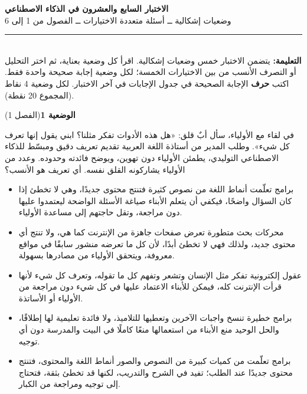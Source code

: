 \documentclass[11pt,a4paper]{article}
\begin{document}
\linespread{1.08}\selectfont
\begin{center}
{\LARGE\khatt\textbf{الاختبار السابع والعشرون في الذكاء الاصطناعي}}\\[4pt]
{\normalsize وضعيات إشكالية ــ أسئلة متعددة الاختيارات ــ الفصول من 1 إلى 6}
\end{center}
\vspace{-2pt}\rule{\textwidth}{0.6pt}\\[2pt]
\textbf{التعليمة:} يتضمن الاختبار خمس وضعيات إشكالية. اقرأ كل وضعية بعناية، ثم اختر التحليل أو التصرف الأنسب
من بين الاختيارات الخمسة؛ لكل وضعية إجابة صحيحة واحدة فقط.
اكتب \textbf{حرف} الإجابة الصحيحة في جدول الإجابات في آخر الاختبار.
لكل وضعية 4 نقاط (المجموع 20 نقطة).
\vspace{4pt}

\noindent
{\large\khatt\textbf{الوضعية 1}}\hfill{\small(الفصل 1)}\par\nopagebreak\vspace{3pt}
\setlength{\fboxsep}{7pt}\colorbox{gray!10}{\parbox{\dimexpr\linewidth-14pt}{في لقاء مع الأولياء، سأل أبٌ قلق: «هل هذه الأدوات تفكر مثلنا؟ ابني يقول إنها تعرف كل شيء». وطلب المدير من أستاذة اللغة العربية تقديم تعريف دقيق ومبسّط للذكاء الاصطناعي التوليدي، يطمئن الأولياء دون تهوين، ويوضح فائدته وحدوده. وعدد من الأولياء يشاركونه القلق نفسه. أي تعريف هو الأنسب؟}}\par\nopagebreak
\begin{itemize}[leftmargin=1.0cm, labelsep=6pt, itemsep=3pt, topsep=4pt, parsep=0pt]
  \item[\textbf{أ)}] برامج تعلّمت أنماط اللغة من نصوص كثيرة فتنتج محتوى جديدًا، وهي لا تخطئ إذا كان السؤال واضحًا، فيكفي أن يتعلم الأبناء صياغة الأسئلة الواضحة ليعتمدوا عليها دون مراجعة، وتقل حاجتهم إلى مساعدة الأولياء.
  \item[\textbf{ب)}] محركات بحث متطورة تعرض صفحات جاهزة من الإنترنت كما هي، ولا تنتج أي محتوى جديد، ولذلك فهي لا تخطئ أبدًا، لأن كل ما تعرضه منشور سابقًا في مواقع معروفة، ويتحقق الأولياء من مصادرها بسهولة.
  \item[\textbf{ج)}] عقول إلكترونية تفكر مثل الإنسان وتشعر وتفهم كل ما تقوله، وتعرف كل شيء لأنها قرأت الإنترنت كله، فيمكن للأبناء الاعتماد عليها في كل شيء دون مراجعة من الأولياء أو الأساتذة.
  \item[\textbf{د)}] برامج خطيرة تنسخ واجبات الآخرين وتعطيها للتلاميذ، ولا فائدة تعليمية لها إطلاقًا، والحل الوحيد منع الأبناء من استعمالها منعًا كاملًا في البيت والمدرسة دون أي توجيه.
  \item[\textbf{هـ)}] برامج تعلّمت من كميات كبيرة من النصوص والصور أنماط اللغة والمحتوى، فتنتج محتوى جديدًا عند الطلب؛ تفيد في الشرح والتدريب، لكنها قد تخطئ بثقة، فتحتاج إلى توجيه ومراجعة من الكبار.
\end{itemize}
\end{document}
